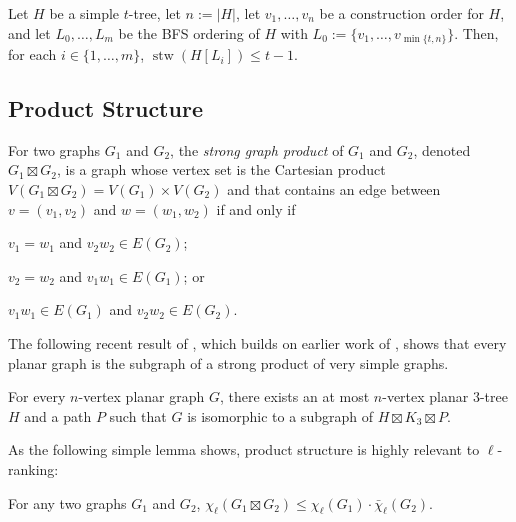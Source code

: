 \documentclass[kpfonts]{patmorin}
\DeclareMathOperator{\stw}{stw}
\newcommand{\lrn}{\chi_{\ell}}
\newcommand{\dlcn}{\bar{\chi}_\ell}
\theoremstyle{named}
\begin{document}
\begin{lem}\label{simple-bfs-layers}
    Let $H$ be a simple $t$-tree, let $n:=|H|$, let $v_1,\ldots,v_n$ be a construction order for $H$, and let $L_0,\ldots,L_m$ be the BFS ordering of $H$ with $L_0:=\{v_1,\ldots,v_{\min\{t,n\}}\}$.   Then, for each $i\in\{1,\ldots,m\}$, $\stw(H[L_i])\le t-1$.
\end{lem}


\subsection{Product Structure}

For two graphs $G_1$ and $G_2$, the \emph{strong graph product} of $G_1$ and $G_2$, denoted $G_1\boxtimes G_2$, is a graph whose vertex set is the Cartesian product $V(G_1\boxtimes G_2)= V(G_1)\times V(G_2)$ and that contains an edge between $v=(v_1,v_2)$ and $w=(w_1,w_2)$ if and only if
\begin{inparaenum}[(i)]
    \item $v_1=w_1$ and $v_2w_2\in E(G_2)$;
    \item $v_2=w_2$ and $v_1w_1\in E(G_1)$; or
    \item $v_1w_1\in E(G_1)$ and $v_2w_2\in E(G_2)$.
\end{inparaenum}

The following recent result of \citet{dujmovic.joret.ea:planar}, which builds on earlier work of \citet{pilipczuk.siebertz:polynomial}, shows that every planar graph is the subgraph of a strong product of very simple graphs.

\begin{thm}\label{product-structure}
    For every $n$-vertex planar graph $G$, there exists an at most $n$-vertex planar 3-tree $H$ and a path $P$ such that $G$ is isomorphic to a subgraph of $H\boxtimes K_3\boxtimes P$.
\end{thm}

As the following simple lemma shows, product structure is highly relevant to $\ell$-ranking:

\begin{lem}\label{product-lemma}
    For any two graphs $G_1$ and $G_2$, $\lrn(G_1\boxtimes G_2)\le \lrn(G_1)\cdot\dlcn(G_2)$.
\end{lem}
\end{document}
